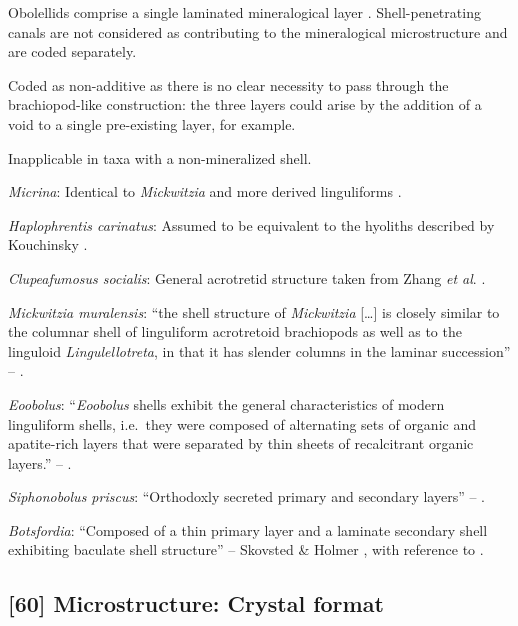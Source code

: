 \documentclass[openany]{book}
\theoremstyle{definition}
\theoremstyle{definition}
\theoremstyle{definition}
\theoremstyle{remark}
\begin{document}
Obolellids comprise a single laminated mineralogical layer
\citep{Balthasar2008iMummpikia}. Shell-penetrating canals are not
considered as contributing to the mineralogical microstructure and are
coded separately.

Coded as non-additive as there is no clear necessity to pass through the
brachiopod-like construction: the three layers could arise by the
addition of a void to a single pre-existing layer, for example.

Inapplicable in taxa with a non-mineralized shell.

\emph{Micrina}: Identical to \emph{Mickwitzia} and more derived
linguliforms \citep{Holmer2011Firstrecord}.

\emph{Haplophrentis carinatus}: Assumed to be equivalent to the hyoliths
described by Kouchinsky
\citeyearpar{Kouchinsky2000Skeletalmicrostructures}.

\emph{Clupeafumosus socialis}: General acrotretid structure taken from
Zhang \emph{et al}. \citeyearpar{Zhang2016Epithelialcell}.

\emph{Mickwitzia muralensis}: ``the shell structure of \emph{Mickwitzia}
{[}\ldots{}{]} is closely similar to the columnar shell of linguliform
acrotretoid brachiopods as well as to the linguloid
\emph{Lingulellotreta}, in that it has slender columns in the laminar
succession'' -- \citet{Williams2007PartH}.

\emph{Eoobolus}: ``\emph{Eoobolus} shells exhibit the general
characteristics of modern linguliform shells, i.e.~they were composed of
alternating sets of organic and apatite-rich layers that were separated
by thin sheets of recalcitrant organic layers.'' --
\citet{Balthasar2007Anearly}.

\emph{Siphonobolus priscus}: ``Orthodoxly secreted primary and secondary
layers'' -- \citet{Williams2004Chemicostructure}.

\emph{Botsfordia}: ``Composed of a thin primary layer and a laminate
secondary shell exhibiting baculate shell structure'' -- Skovsted \&
Holmer \citeyearpar{Skovsted2005EarlyCambrian}, with reference to
\citet{Skovsted2003EarlyCambrian}.

\hypertarget{microstructure-crystal-format}{%
\subsection*{{[}60{]} Microstructure: Crystal
format}\label{microstructure-crystal-format}}
\end{document}
